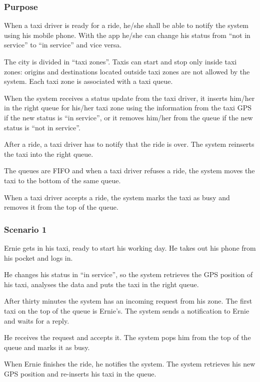 \label{taxi-availability}
\subsubsection{Purpose}

When a taxi driver is ready for a ride, he/she shall be able to notify the system using his mobile phone. With the app he/she can change his status from ``not in service'' to ``in service'' and vice versa.

The city is divided in ``taxi zones''. Taxis can start and stop only inside taxi zones: origins and destinations located outside taxi zones are not allowed by the system.
Each taxi zone is associated with a taxi queue.

When the system receives a status update from the taxi driver, it inserts him/her in the right queue for his/her taxi zone using the information from the taxi GPS if the new status is ``in service'', or it removes him/her from the queue if the new status is ``not in service''.

After a ride, a taxi driver has to notify that the ride is over. The system reinserts the taxi into the right queue.

The queues are FIFO and when a taxi driver refuses a ride, the system moves the taxi to the bottom of the same queue.

When a taxi driver accepts a ride, the system marks the taxi as busy and removes it from the top of the queue.

\subsubsection{Scenario 1}
Ernie gets in his taxi, ready to start his working day. He takes out his phone from his pocket and logs in.

He changes his status in ``in service'', so the system retrieves the GPS position of his taxi, analyses the data and puts the taxi in the right queue.

After thirty minutes the system has an incoming request from his zone. The first taxi on the top of the queue is Ernie's. The system sends a notification to Ernie and waits for a reply.

He receives the request and accepts it. The system pops him from the top of the queue and marks it as busy.

When Ernie finishes the ride, he notifies the system. The system retrieves his new GPS position and re-inserts his taxi in the queue.

